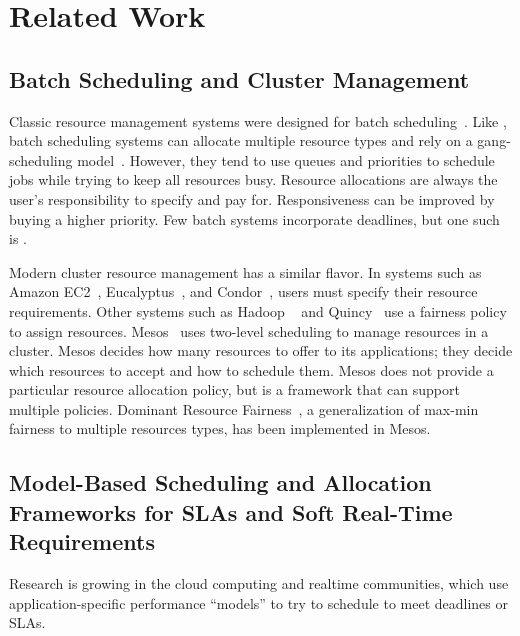 \section{Related Work}\label{related_work}
\subsection{Batch Scheduling and Cluster Management}
Classic resource management systems were designed for batch scheduling~\cite{Feit97,FRS04}. Like \pacora, batch scheduling systems can allocate multiple resource types and rely on a gang-scheduling model~\cite{FeRu92}.  However, they tend to use queues and priorities to schedule jobs while trying to keep all resources busy. Resource allocations are always the user's responsibility to specify and pay for. Responsiveness can be improved by buying a higher priority. Few batch systems incorporate deadlines, but one such is \cite{AKKMS95}.

Modern cluster resource management has a similar flavor.  In systems such as
Amazon EC2~\cite{EC2}, Eucalyptus~\cite{eucalyptus}, and Condor~\cite{Condor}, users must specify their resource requirements.  Other systems such as Hadoop ~\cite{hadoop_fair, hadoop_cap, hadoop_matei} and Quincy~\cite{Quincy} use a fairness policy to assign resources. Mesos~\cite{mesos} uses two-level scheduling to manage resources in a cluster. Mesos decides how many resources to offer to its applications; they decide which resources to accept and how to schedule them. Mesos does not provide a particular resource allocation policy, but is a framework that can support multiple policies. Dominant Resource Fairness~\cite{mesos-DRF}, a generalization of max-min fairness to multiple resources types, has been implemented in Mesos.

\subsection{Model-Based Scheduling and Allocation Frameworks for SLAs and Soft Real-Time Requirements}

Research is growing in the cloud computing and realtime communities, which use application-specific performance ``models'' to try to schedule to meet deadlines or SLAs.

